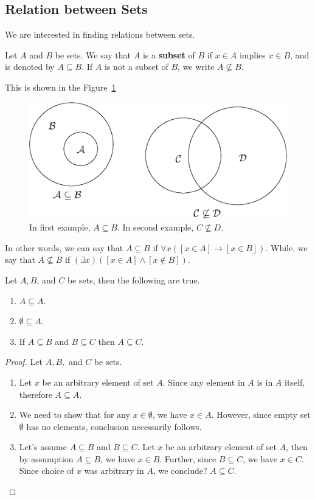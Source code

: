\documentclass[a4paper,english,12pt]{article}
\begin{document}
\subsection{Relation between Sets}
We are interested in finding relations between sets.
\begin{defn}[Subset] Let ${A}$ and ${B}$ be sets. We say that ${A}$ is a \textbf{subset} of ${B}$ if $x\in {A}$ implies $x\in {B}$, and is denoted by ${A}\subseteq {B}$. If $A$ is not a subset of $B$, we write $A \nsubseteq B$.
\end{defn}
This is shown in the Figure~\ref{Fig:Sets}
\begin{figure}[!h]
\centering
 \includegraphics[height=2.0in]{fig33.eps}
\caption{In first example, $A \subseteq B$. In second example, $C \nsubseteq D$.}
\label{Fig:Sets}
\end{figure}
In other words, we can say that ${A}\subseteq {B}$ if $\forall x ([x\in {A}] \rightarrow [x\in{B}])$. While, we say that ${A}\nsubseteq{B}$ if $(\exists x) ([x\in{A}]\wedge[x\not\in{B}])$.

\begin{lem} Let ${A},{B}$, and ${C}$ be sets, then the following are true.
\begin{enumerate}
 \item ${A}\subseteq {A}$.
 \item ${\emptyset}\subseteq{A}$.
 \item If ${A}\subseteq{B}$ and ${B}\subseteq{C}$ then ${A}\subseteq{C}$.
\end{enumerate}
\end{lem}

\begin{proof} Let ${A},{B},$ and ${C}$ be sets.
\begin{enumerate}
 \item %
Let $x$ be an arbitrary element of set ${A}$. Since any element in ${A}$ is in ${A}$ itself, therefore ${A}\subseteq {A}$.
 \item We need to show that for any $x \in \emptyset$, we have $x \in A$. However, since empty set $\emptyset$ has no elements, conclusion necessarily follows. %
 \item Let's assume ${A}\subseteq {B}$ and $B \subseteq C$. Let $x$ be an arbitrary element of set ${A}$, then by assumption $A \subseteq B$, we have $x \in {B}$. Further, since ${B}\subseteq{C}$, we have $x\in {C}$. Since choice of $x$ was arbitrary in $A$, we conclude? ${A}\subseteq{C}$.
\end{enumerate}
\end{proof}
\end{document}
